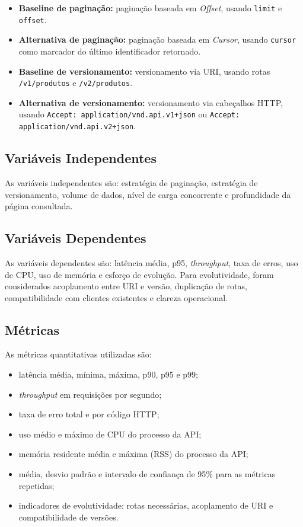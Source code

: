 \documentclass[journal]{IEEEtran}
\begin{document}
\begin{itemize}
    \item \textbf{Baseline de paginação:} paginação baseada em \textit{Offset}, usando \texttt{limit} e \texttt{offset}.
    \item \textbf{Alternativa de paginação:} paginação baseada em \textit{Cursor}, usando \texttt{cursor} como marcador do último identificador retornado.
    \item \textbf{Baseline de versionamento:} versionamento via URI, usando rotas \texttt{/v1/produtos} e \texttt{/v2/produtos}.
    \item \textbf{Alternativa de versionamento:} versionamento via cabeçalhos HTTP, usando \texttt{Accept: application/vnd.api.v1+json} ou \texttt{Accept: application/vnd.api.v2+json}.
\end{itemize}

\subsection{Variáveis Independentes}

As variáveis independentes são: estratégia de paginação, estratégia de versionamento, volume de dados, nível de carga concorrente e profundidade da página consultada.

\subsection{Variáveis Dependentes}

As variáveis dependentes são: latência média, p95, \textit{throughput}, taxa de erros, uso de CPU, uso de memória e esforço de evolução. Para evolutividade, foram considerados acoplamento entre URI e versão, duplicação de rotas, compatibilidade com clientes existentes e clareza operacional.

\subsection{Métricas}

As métricas quantitativas utilizadas são:

\begin{itemize}
    \item latência média, mínima, máxima, p90, p95 e p99;
    \item \textit{throughput} em requisições por segundo;
    \item taxa de erro total e por código HTTP;
    \item uso médio e máximo de CPU do processo da API;
    \item memória residente média e máxima (RSS) do processo da API;
    \item média, desvio padrão e intervalo de confiança de 95\% para as métricas repetidas;
    \item indicadores de evolutividade: rotas necessárias, acoplamento de URI e compatibilidade de versões.
\end{itemize}
\end{document}
